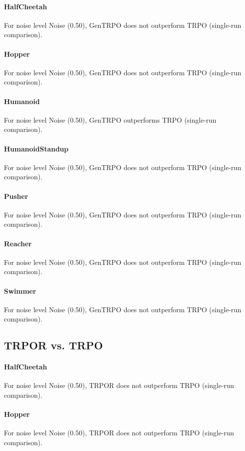 \paragraph{HalfCheetah}
For noise level Noise (0.50), GenTRPO does not outperform TRPO (single-run comparison).
\paragraph{Hopper}
For noise level Noise (0.50), GenTRPO does not outperform TRPO (single-run comparison).
\paragraph{Humanoid}
For noise level Noise (0.50), GenTRPO outperforms TRPO (single-run comparison).
\paragraph{HumanoidStandup}
For noise level Noise (0.50), GenTRPO does not outperform TRPO (single-run comparison).
\paragraph{Pusher}
For noise level Noise (0.50), GenTRPO does not outperform TRPO (single-run comparison).
\paragraph{Reacher}
For noise level Noise (0.50), GenTRPO does not outperform TRPO (single-run comparison).
\paragraph{Swimmer}
For noise level Noise (0.50), GenTRPO does not outperform TRPO (single-run comparison).
\subsection{TRPOR vs. TRPO}
\paragraph{HalfCheetah}
For noise level Noise (0.50), TRPOR does not outperform TRPO (single-run comparison).
\paragraph{Hopper}
For noise level Noise (0.50), TRPOR does not outperform TRPO (single-run comparison).
